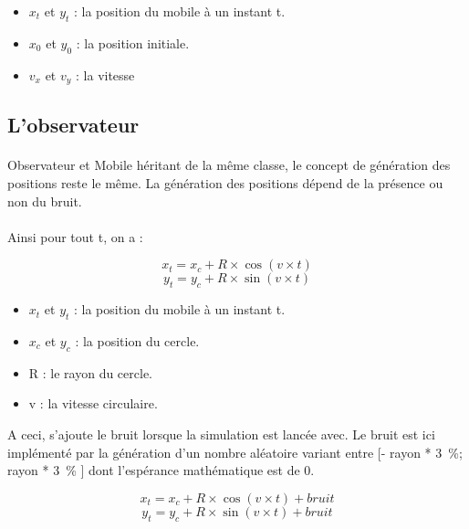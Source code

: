 \documentclass[a4paper,11pt]{article}
\begin{document}
 		\begin{itemize}
			\item $x_{t}$ et $y_{t}$ : la position du mobile à un instant t.
			\item $x_{0}$ et $y_{0}$ : la position initiale.
			\item $v_{x}$ et $v_{y}$ : la vitesse
		\end{itemize}

		\newpage

		\subsection{L'observateur}
		\paragraph{}
		Observateur et Mobile héritant de la même classe, le concept de génération des positions reste le même. La génération des positions dépend de la présence ou non du bruit.
		
		\paragraph{}
		Ainsi pour tout t, on a :
		
			\begin{equation} 
				x_{t} = x_{c} + R \times \cos( v \times t) 
			\end{equation}
			\begin{equation} 
				y_{t} = y_{c} + R \times \sin( v \times t) 
			\end{equation}

 		\begin{itemize}
			\item $x_{t}$ et $y_{t}$ : la position du mobile à un instant t.
			\item $x_{c}$ et $y_{c}$ : la position du cercle.
			\item R : le rayon du cercle.
			\item v : la vitesse circulaire.
		\end{itemize}
		
		A ceci, s'ajoute le bruit lorsque la simulation est lancée avec. Le bruit est ici implémenté par la génération d'un nombre aléatoire variant entre [- rayon * 3 \%; rayon * 3 \% ] dont l’espérance mathématique est de 0.

			\begin{equation} 
				x_{t} = x_{c} + R \times \cos( v \times t)  + bruit
			\end{equation}
			\begin{equation} 
				y_{t} = y_{c} + R \times \sin( v \times t) + bruit
			\end{equation}
\end{document}
